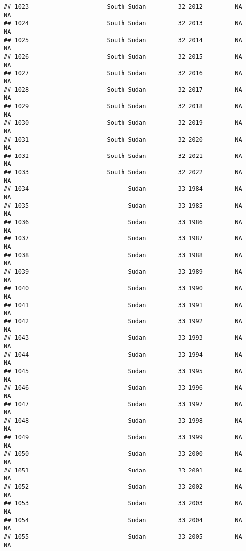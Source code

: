 \documentclass[
]{article}
\begin{document}
\begin{verbatim}
## 1023                      South Sudan         32 2012         NA         NA
## 1024                      South Sudan         32 2013         NA         NA
## 1025                      South Sudan         32 2014         NA         NA
## 1026                      South Sudan         32 2015         NA         NA
## 1027                      South Sudan         32 2016         NA         NA
## 1028                      South Sudan         32 2017         NA         NA
## 1029                      South Sudan         32 2018         NA         NA
## 1030                      South Sudan         32 2019         NA         NA
## 1031                      South Sudan         32 2020         NA         NA
## 1032                      South Sudan         32 2021         NA         NA
## 1033                      South Sudan         32 2022         NA         NA
## 1034                            Sudan         33 1984         NA         NA
## 1035                            Sudan         33 1985         NA         NA
## 1036                            Sudan         33 1986         NA         NA
## 1037                            Sudan         33 1987         NA         NA
## 1038                            Sudan         33 1988         NA         NA
## 1039                            Sudan         33 1989         NA         NA
## 1040                            Sudan         33 1990         NA         NA
## 1041                            Sudan         33 1991         NA         NA
## 1042                            Sudan         33 1992         NA         NA
## 1043                            Sudan         33 1993         NA         NA
## 1044                            Sudan         33 1994         NA         NA
## 1045                            Sudan         33 1995         NA         NA
## 1046                            Sudan         33 1996         NA         NA
## 1047                            Sudan         33 1997         NA         NA
## 1048                            Sudan         33 1998         NA         NA
## 1049                            Sudan         33 1999         NA         NA
## 1050                            Sudan         33 2000         NA         NA
## 1051                            Sudan         33 2001         NA         NA
## 1052                            Sudan         33 2002         NA         NA
## 1053                            Sudan         33 2003         NA         NA
## 1054                            Sudan         33 2004         NA         NA
## 1055                            Sudan         33 2005         NA         NA

\end{verbatim}
\end{document}
